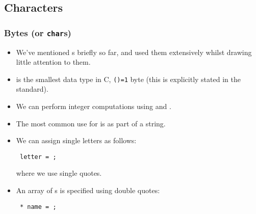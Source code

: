\documentclass[smaller,table]{beamer} %
\begin{document}
\subsection{Characters}
\begin{frame}
\frametitle{Bytes (or {\tt char}s)}
\begin{itemize}
\item We've mentioned {\tt {}}s briefly so far, and used them extensively whilst drawing little attention to them.
\item {\tt {}} is the smallest data type in C, {\tt {}()=1} byte (this is explicitly stated in the standard).
\item We can perform integer computations using {\tt {}} and {\tt {}}.
\item The most common use for {\tt {}} is as part of a string.
\item We can assign single letters as follows:
\begin{center}
{\tt {} letter = ;}
\end{center}
where we use single quotes.
\item An array of {\tt {}}s is specified using double quotes:
\begin{center}
\tt {} * name = ;
\end{center}
\end{itemize}
\end{frame}


\newcommand{\scs}[1]{\scriptsize \sc#1}
\newcommand{\scc}[1]{$\mathtt{\backslash}$\tt#1}
\end{document}
